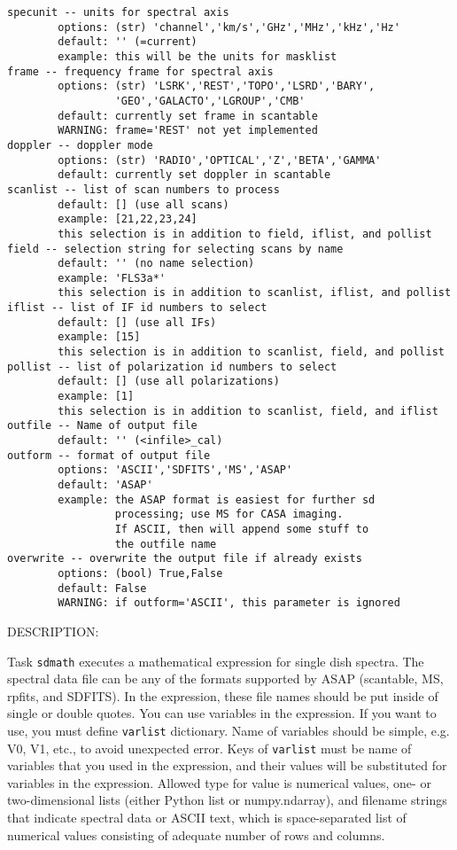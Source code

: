 \begin{verbatim}
specunit -- units for spectral axis
        options: (str) 'channel','km/s','GHz','MHz','kHz','Hz'
        default: '' (=current)
        example: this will be the units for masklist
frame -- frequency frame for spectral axis
        options: (str) 'LSRK','REST','TOPO','LSRD','BARY',
                 'GEO','GALACTO','LGROUP','CMB'
        default: currently set frame in scantable
        WARNING: frame='REST' not yet implemented
doppler -- doppler mode
        options: (str) 'RADIO','OPTICAL','Z','BETA','GAMMA'
        default: currently set doppler in scantable
scanlist -- list of scan numbers to process
        default: [] (use all scans)
        example: [21,22,23,24]
        this selection is in addition to field, iflist, and pollist
field -- selection string for selecting scans by name
        default: '' (no name selection)
        example: 'FLS3a*'
        this selection is in addition to scanlist, iflist, and pollist
iflist -- list of IF id numbers to select
        default: [] (use all IFs)
        example: [15]
        this selection is in addition to scanlist, field, and pollist
pollist -- list of polarization id numbers to select
        default: [] (use all polarizations)
        example: [1]
        this selection is in addition to scanlist, field, and iflist
outfile -- Name of output file
        default: '' (<infile>_cal)
outform -- format of output file
        options: 'ASCII','SDFITS','MS','ASAP'
        default: 'ASAP'
        example: the ASAP format is easiest for further sd
                 processing; use MS for CASA imaging.
                 If ASCII, then will append some stuff to
                 the outfile name
overwrite -- overwrite the output file if already exists
        options: (bool) True,False
        default: False
        WARNING: if outform='ASCII', this parameter is ignored
\end{verbatim}

DESCRIPTION:

Task {\tt sdmath} executes a mathematical expression for single dish spectra.
The spectral data file can be any of the formats supported by
ASAP (scantable, MS, rpfits, and SDFITS). In the expression, 
these file names should be put inside of single or double quotes.
You can use variables in the expression. If you want to use, you must
define {\tt varlist} dictionary. Name of variables should be simple, e.g.
V0, V1, etc., to avoid unexpected error. Keys of {\tt varlist} must be name
of variables that you used in the expression, and their values will
be substituted for variables in the expression. Allowed type for value
is numerical values, one- or two-dimensional lists (either Python list
or numpy.ndarray), and filename strings that indicate spectral data
or ASCII text, which is space-separated list of numerical values
consisting of adequate number of rows and columns.
     
